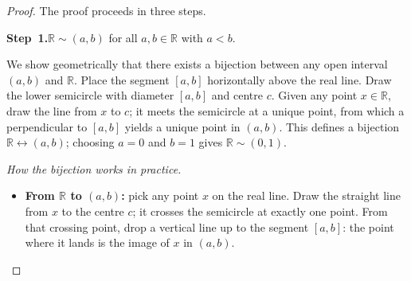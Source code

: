\documentclass[12pt]{article}
\theoremstyle{definition}
\theoremstyle{plain}
\theoremstyle{remark}
\newcommand{\R}{\mathbb{R}}
\begin{document}
\begin{proof}
The proof proceeds in three steps.

\medskip
\noindent\textbf{Step~1.}\quad $\R \sim (a,b)$ for all $a,b\in\R$ with $a<b$.

\smallskip
We show geometrically that there exists a bijection between any open interval
$(a,b)$ and $\R$. Place the segment $[a,b]$ horizontally above the real line.
Draw the lower semicircle with diameter $[a,b]$ and centre $c$. Given any point
$x\in\R$, draw the line from $x$ to $c$; it meets the semicircle at a unique point,
from which a perpendicular to $[a,b]$ yields a unique point in $(a,b)$. This defines
a bijection $\R\leftrightarrow(a,b)$; choosing $a=0$ and $b=1$ gives $\R\sim(0,1)$.

\begin{center}
\end{center}

\smallskip
\noindent\textit{How the bijection works in practice.}
\begin{itemize}[nosep]
    \item \textbf{From $\R$ to $(a,b)$:} pick any point $x$ on the real line.
          Draw the straight line from $x$ to the centre $c$; it crosses the
          semicircle at exactly one point. From that crossing point, drop a
          vertical line up to the segment $[a,b]$: the point where it lands is
          the image of $x$ in $(a,b)$.


\end{itemize}
\end{proof}
\end{document}
